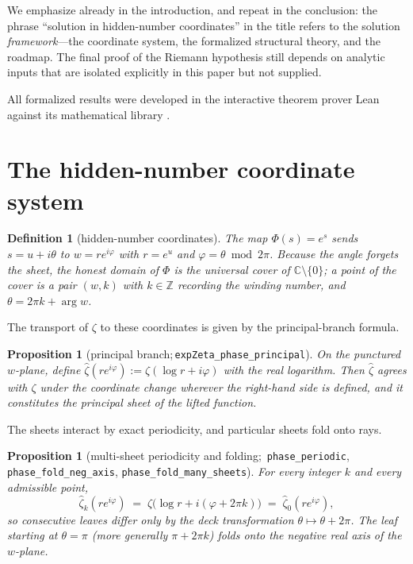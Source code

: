 \documentclass[submission]{jsfds}
\newtheorem{proposition}[theorem]{Proposition}
\newtheorem{definition}[theorem]{Definition}
\newcommand{\Lean}[1]{\texttt{#1}}
\begin{document}
We emphasize already in the introduction, and repeat in the conclusion: the
phrase ``solution in hidden-number coordinates'' in the title refers to the
solution \emph{framework}---the coordinate system, the formalized structural
theory, and the roadmap. The final proof of the Riemann hypothesis still depends
on analytic inputs that are isolated explicitly in this paper but not supplied.

All formalized results were developed in the interactive theorem prover Lean
\citep{deMoura2015} against its mathematical library \citep{MathlibCommunity2020}.

\section{The hidden-number coordinate system}\label{sec:coords}

\begin{definition}[hidden-number coordinates]\label{def:coords}
The map $\Phi(s)=e^{s}$ sends $s=u+i\theta$ to $w=re^{i\varphi}$ with
$r=e^{u}$ and $\varphi=\theta \bmod 2\pi$. Because the angle forgets the sheet,
the honest domain of $\Phi$ is the universal cover of $\mathbb{C}\setminus\{0\}$;
a point of the cover is a pair $(w,k)$ with $k\in\mathbb{Z}$ recording the
winding number, and $\theta=2\pi k+\arg w$.
\end{definition}

The transport of $\zeta$ to these coordinates is given by the principal-branch
formula.

\begin{proposition}[principal branch;\,\Lean{expZeta_phase_principal}]\label{prop:principal}
On the punctured $w$-plane, define $\widehat{\zeta}(re^{i\varphi})
:=\zeta(\log r+i\varphi)$ with the real logarithm. Then $\widehat{\zeta}$ agrees
with $\zeta$ under the coordinate change wherever the right-hand side is
defined, and it constitutes the principal sheet of the lifted function.
\end{proposition}

The sheets interact by exact periodicity, and particular sheets fold onto rays.

\begin{proposition}[multi-sheet periodicity and folding;\,
\Lean{phase_periodic}, \Lean{phase_fold_neg_axis},
\Lean{phase_fold_many_sheets}]\label{prop:periodic}
For every integer $k$ and every admissible point,
\[
  \widehat{\zeta}_{k}(re^{i\varphi})
  \;=\; \zeta\bigl(\log r+i(\varphi+2\pi k)\bigr)
  \;=\; \widehat{\zeta}_{0}(re^{i\varphi}),
\]
so consecutive leaves differ only by the deck transformation $\theta\mapsto
\theta+2\pi$. The leaf starting at $\theta=\pi$ (more generally
$\pi+2\pi k$) folds onto the negative real axis of the $w$-plane.
\end{proposition}
\end{document}
